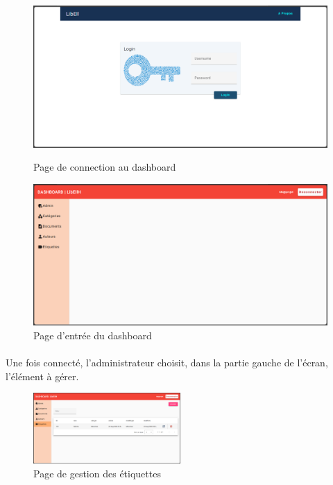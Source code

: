 				
		\begin{figure}
			\centering
			\begin{minipage}{0.45\textwidth}
				\centering
				\includegraphics[width=\textwidth]{Pictures/PageDeConnection.png}
				\caption{Page de connection au dashboard}
				\label{FigLoginPage}
			\end{minipage}
			\hspace{5pt}
			\begin{minipage}{0.45\textwidth}
				\centering
				\includegraphics[width=\textwidth]{Pictures/Dashboard_rootPage.png}
				\caption{Page d'entr\'ee du dashboard}
				\label{FigDashboardRoot}
			\end{minipage}
		\end{figure}
		
		
		\paragraph{} Une fois connect\'e, l'administrateur choisit, dans la partie gauche de l'\'ecran, l'\'el\'ement \`a g\'erer.
		
		\begin{figure}[!ht]
			\includegraphics[width=0.5\textwidth]{Pictures/Dashboard_Etiquette.png}
			\centering
			\caption{Page de gestion des \'etiquettes}
			\label{FigChoixTypeElement}
		\end{figure}
		
